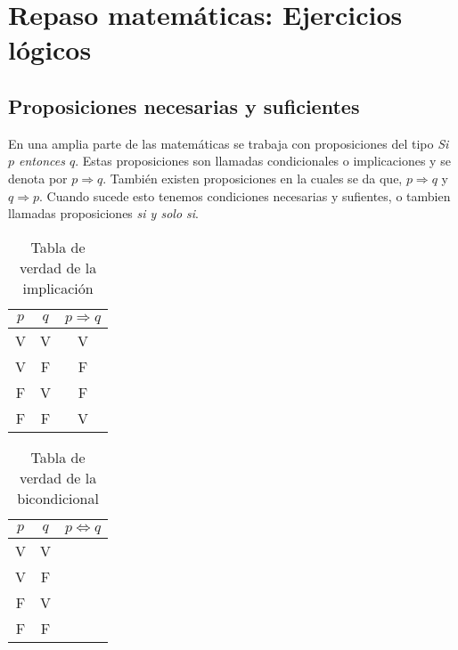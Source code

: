 \documentclass{assignment}
\begin{document}
\maketitle


\section{Repaso matemáticas: Ejercicios lógicos}

\subsection*{Proposiciones necesarias y suficientes}

En una amplia parte de las matemáticas se trabaja con proposiciones del tipo \emph{Si $p$ entonces $q$}. Estas proposiciones son llamadas condicionales o implicaciones y se denota por $p  \Rightarrow q$. También existen proposiciones en la cuales se da que, $p  \Rightarrow q$ y $q \Rightarrow p$. Cuando sucede esto tenemos condiciones necesarias y sufientes, o tambien llamadas proposiciones \emph{si y solo si}.



\begin{table}[h]
    \centering
    \begin{tabular}{|c|c|c|}
    \hline
    $p$  & $q$ & $p  \Rightarrow  q$   \\
    \hline
    V  & V & V   \\
    \hline
    V  & F & F   \\
    \hline
    F  & V & F   \\
    \hline
    F  & F & V   \\
    \hline
    \end{tabular}
    \caption{Tabla de verdad de la implicación}

\end{table}

\begin{table}[h]
    \centering
    \begin{tabular}{|c|c|c|}
    \hline
    $p$  & $q$ & $p  \Leftrightarrow  q$   \\
    \hline
    V  & V &    \\
    \hline
    V  & F &    \\
    \hline
    F  & V &    \\
    \hline
    F  & F &   \\
    \hline
    \end{tabular}
    \caption{Tabla de verdad de la bicondicional}

\end{table}
\end{document}
